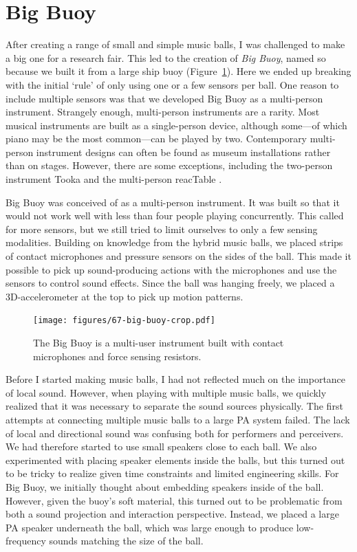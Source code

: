 \section{Big Buoy} \label{sect:big-buoy}

After creating a range of small and simple music balls, I was challenged to make a big one for a research fair. This led to the creation of \emph{Big Buoy}, named so because we built it from a large ship buoy (Figure~\ref{fig:figures_giant-music-ball_09-Musikkball}). Here we ended up breaking with the initial `rule' of only using one or a few sensors per ball. One reason to include multiple sensors was that we developed Big Buoy as a multi-person instrument. Strangely enough, multi-person instruments are a rarity. Most musical instruments are built as a single-person device, although some---of which piano may be the most common---can be played by two. Contemporary multi-person instrument designs can often be found as museum installations rather than on stages. However, there are some exceptions, including the two-person instrument Tooka \citep{fels_tooka:_2002} and the multi-person reacTable \citep{jorda_reactable*_2005}.

Big Buoy was conceived of as a multi-person instrument. It was built so that it would not work well with less than four people playing concurrently. This called for more sensors, but we still tried to limit ourselves to only a few sensing modalities. Building on knowledge from the hybrid music balls, we placed strips of contact microphones and pressure sensors on the sides of the ball. This made it possible to pick up sound-producing actions with the microphones and use the sensors to control sound effects. Since the ball was hanging freely, we placed a 3D-accelerometer at the top to pick up motion patterns.

\begin{figure}[tbp]
	\centering
		\texttt{[image: figures/67-big-buoy-crop.pdf]}
	\caption{The Big Buoy is a multi-user instrument built with contact microphones and force sensing resistors.}
	\label{fig:figures_giant-music-ball_09-Musikkball}
\end{figure}

Before I started making music balls, I had not reflected much on the importance of local sound. However, when playing with multiple music balls, we quickly realized that it was necessary to separate the sound sources physically. The first attempts at connecting multiple music balls to a large PA system failed. The lack of local and directional sound was confusing both for performers and perceivers. We had therefore started to use small speakers close to each ball. We also experimented with placing speaker elements inside the balls, but this turned out to be tricky to realize given time constraints and limited engineering skills. For Big Buoy, we initially thought about embedding speakers inside of the ball. However, given the buoy's soft material, this turned out to be problematic from both a sound projection and interaction perspective. Instead, we placed a large PA speaker underneath the ball, which was large enough to produce low-frequency sounds matching the size of the ball.

